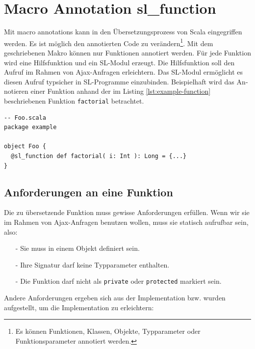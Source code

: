 \documentclass[12pt,bibtotoc]{scrreprt}
\begin{document}

\section{Macro Annotation sl\_function }
\label{sec:annotation-macro}

Mit macro annotations kann in den Übersetzungsprozess von Scala eingegriffen werden\cite{EPFL1}. Es ist möglich den annotierten Code zu verändern\footnote{Es können Funktionen, Klassen, Objekte, Typparameter oder Funktionsparameter annotiert werden.}. Mit dem geschriebenen Makro können nur Funktionen annotiert werden. Für jede Funktion wird eine Hilfsfunktion und ein \ac{SL}-Modul erzeugt. Die Hilfsfunktion soll den Aufruf im Rahmen von Ajax-Anfragen erleichtern. Das \ac{SL}-Modul ermöglicht es diesen Aufruf typsicher in \ac{SL}-Programme einzubinden. Beispielhaft wird das An­no­tie­ren einer Funktion anhand der im Listing \ref{lst:example-function} beschriebenen Funktion \lstinline!factorial! betrachtet.


\begin{lstlisting}[caption=Scala Beispielfunktion, label=lst:example-function, float=h]
-- Foo.scala
package example

object Foo {
  @sl_function def factorial( i: Int ): Long = {...}
}
\end{lstlisting}

\subsection{Anforderungen an eine Funktion}

Die zu übersetzende Funktion muss gewisse Anforderungen erfüllen. Wenn wir sie im Rahmen von Ajax-Anfragen benutzen wollen, muss sie statisch aufrufbar sein, also:
\begin{itemize}
  \item[-]{Sie muss in einem Objekt definiert sein.}
  \item[-]{Ihre Signatur darf keine Typparameter enthalten.}
  \item[-]{Die Funktion darf nicht als \lstinline!private! oder \lstinline!protected! markiert sein.}
 \end{itemize}

Andere Anforderungen ergeben sich aus der Implementation bzw. wurden aufgestellt, um die Implementation zu erleichtern:
\end{document}
